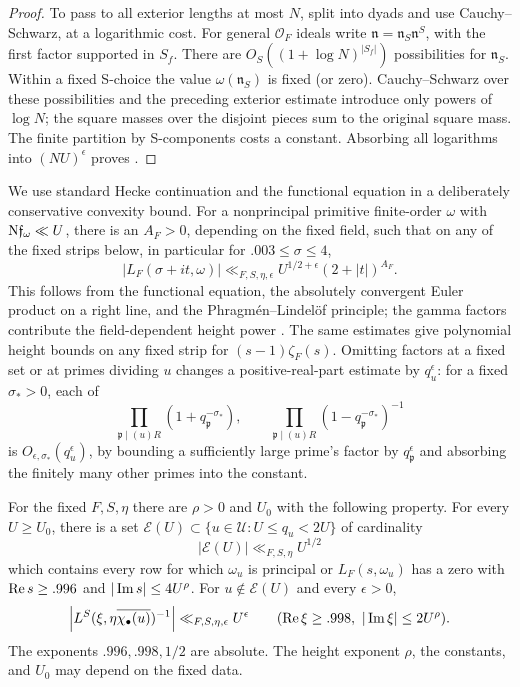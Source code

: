 \begin{proof}
To pass to all exterior lengths at most \(N\), split into dyads and use
Cauchy--Schwarz, at a logarithmic cost.  For general \(\mathcal O_F\)
ideals write \(\mathfrak n=\mathfrak n_S\mathfrak n^S\), with the first
factor supported in \(S_f\).  There are
\(O_S((1+\log N)^{|S_f|})\) possibilities for \(\mathfrak n_S\).
Within a fixed S-choice the value \(\omega(\mathfrak n_S)\) is fixed
(or zero).  Cauchy--Schwarz over these possibilities and the preceding
exterior estimate introduce only powers of \(\log N\); the square masses
over the disjoint pieces sum to the original square mass.  The finite
partition by S-components costs a constant.  Absorbing all logarithms
into \((NU)^\epsilon\) proves .
\end{proof}

We use standard Hecke continuation and the functional equation in a
deliberately conservative convexity bound.  For a nonprincipal primitive
finite-order \(\omega\) with \(\mathrm{N}\mathfrak f_\omega\ll U\), there is
an \(A_F>0\), depending on the fixed field, such that on any of the
fixed strips below, in particular for \(.003\le\sigma\le4\),
\begin{equation}
 |L_F(\sigma+it,\omega)|
       \ll_{F,S,\eta,\epsilon}U^{1/2+\epsilon}(2+|t|)^{A_F}.
\label{eq:Hecke-conservative-convexity}
\end{equation}
This follows from the functional equation, the absolutely convergent
Euler product on a right line, and the Phragmén--Lindelöf principle;
the gamma factors contribute the field-dependent height power
\cite[Main Theorem~4.4.1 and \S4.5]{Tate67}.  The same estimates give polynomial height bounds
on any fixed strip for \((s-1)\zeta_F(s)\).  Omitting factors at a fixed set or
at primes dividing \(u\) changes a positive-real-part estimate by
\(q_u^\epsilon\): for a fixed \(\sigma_*>0\), each of
\[
 \prod_{\mathfrak p\mid(u)R}(1+q_{\mathfrak p}^{-\sigma_*}),
 \qquad
 \prod_{\mathfrak p\mid(u)R}(1-q_{\mathfrak p}^{-\sigma_*})^{-1}
\]
is \(O_{\epsilon,\sigma_*}(q_u^\epsilon)\), by bounding a sufficiently
large prime's factor by \(q_{\mathfrak p}^\epsilon\) and absorbing the
finitely many other primes into the constant.

\begin{proposition}\label{prop:zero-density}
For the fixed \(F,S,\eta\) there are \(\rho>0\) and \(U_0\) with the
following property.  For every \(U\ge U_0\), there is a set
\(\mathcal E(U)\subset\{u\in\mathcal U:U\le q_u<2U\}\) of cardinality
\[
 |\mathcal E(U)|\ll_{F,S,\eta}U^{1/2}
\]
which contains every row for which \(\omega_u\) is principal or
\(L_F(s,\omega_u)\) has a zero with
\(\operatorname{Re} s\ge .996\) and \(|\operatorname{Im} s|\le4U^\rho\).
For \(u\notin\mathcal E(U)\) and every \(\epsilon>0\),
\begin{equation}
 \left|L^S(\xi,\eta\overline{\chi_\bullet(u)})^{-1}\right|
       \ll_{F,S,\eta,\epsilon}U^\epsilon
 \qquad
       (\operatorname{Re}\xi\ge .998,\ |\operatorname{Im}\xi|\le2U^\rho).
\label{eq:good-reciprocal}
\end{equation}
The exponents \(.996,.998,1/2\) are absolute.  The height exponent
\(\rho\), the constants, and \(U_0\) may depend on the fixed data.
\end{proposition}

